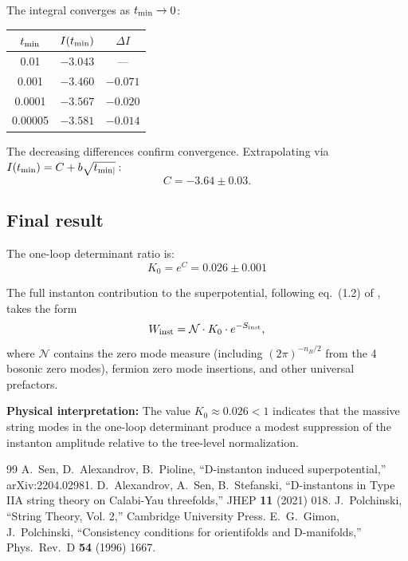 \documentclass[11pt]{article}
\begin{document}
The integral converges as $t_{\rm min} \to 0$:
\begin{center}
\begin{tabular}{|c|c|c|}
\hline
$t_{\rm min}$ & $I(t_{\rm min})$ & $\Delta I$ \\
\hline
0.01 & $-3.043$ & --- \\
0.001 & $-3.460$ & $-0.071$ \\
0.0001 & $-3.567$ & $-0.020$ \\
0.00005 & $-3.581$ & $-0.014$ \\
\hline
\end{tabular}
\end{center}
The decreasing differences confirm convergence. Extrapolating via $I(t_{\rm min}) = C + b\sqrt{t_{\rm min|}}\,$:
\begin{equation}
C = -3.64 \pm 0.03.
\end{equation}

\subsection{Final result}

The one-loop determinant ratio is:
\begin{equation}\boxed{
K_0 = e^C = 0.026 \pm 0.001
}\end{equation}

The full instanton contribution to the superpotential, following eq.~(1.2) of \cite{Sen:2021tpp}, takes the form
\begin{equation}
W_{\rm inst} = \mathcal{N} \cdot K_0 \cdot e^{-S_{\rm inst}},
\end{equation}
where $\mathcal{N}$ contains the zero mode measure (including $(2\pi)^{-n_B/2}$ from the 4 bosonic zero modes), fermion zero mode insertions, and other universal prefactors.

\textbf{Physical interpretation:} The value $K_0 \approx 0.026 < 1$ indicates that the massive string modes in the one-loop determinant produce a modest suppression of the instanton amplitude relative to the tree-level normalization.

\begin{thebibliography}{99}
 A.~Sen, D.~Alexandrov, B.~Pioline, ``D-instanton induced superpotential,'' arXiv:2204.02981.
 D.~Alexandrov, A.~Sen, B.~Stefanski, ``D-instantons in Type IIA string theory on Calabi-Yau threefolds,'' JHEP \textbf{11} (2021) 018.
 J.~Polchinski, ``String Theory, Vol. 2,'' Cambridge University Press.
 E.~G.~Gimon, J.~Polchinski, ``Consistency conditions for orientifolds and D-manifolds,'' Phys.~Rev.~D \textbf{54} (1996) 1667.
\end{thebibliography}
\end{document}
